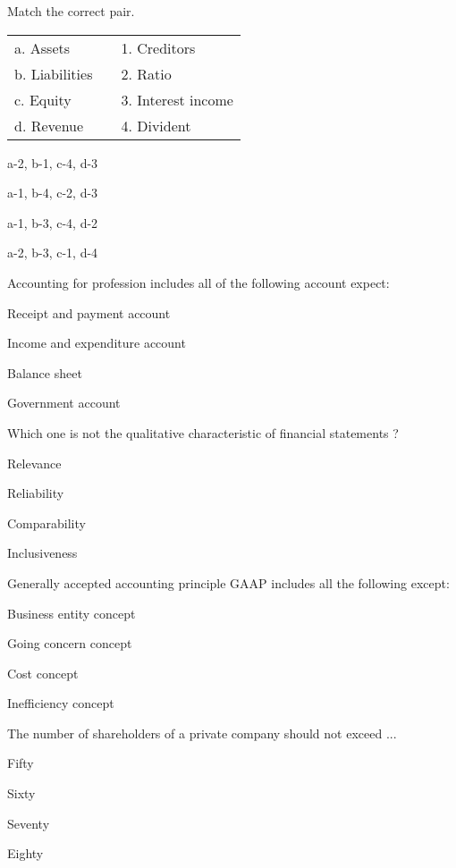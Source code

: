 \begin{questions}
\question Match the correct pair.
  \begin{table}[h]
  \centering
  \begin{tabular}{lll}
    a. Assets & & 1. Creditors \\[2mm]
    b. Liabilities & & 2. Ratio \\
    c. Equity & & 3. Interest income \\
    d. Revenue & & 4. Divident \\
  \end{tabular}
  \end{table}
  \begin{items}
  \item a-2, b-1, c-4, d-3
  \item a-1, b-4, c-2, d-3
  \item a-1, b-3, c-4, d-2
  \item a-2, b-3, c-1, d-4
  \end{items}

\question Accounting for profession includes all of the following account expect:
  \begin{items}
  \item Receipt and payment account
  \item Income and expenditure account
  \item Balance sheet
  \item Government account
  \end{items}

\question Which one is not the qualitative characteristic of financial statements ?
  \begin{items}
  \item Relevance
  \item Reliability
  \item Comparability
  \item Inclusiveness
  \end{items}

\question Generally accepted accounting principle GAAP includes all the following except:
  \begin{items}
  \item Business entity concept
  \item Going concern concept
  \item Cost concept
  \item Inefficiency concept
  \end{items}

\question The number of shareholders of a private company should not exceed ...
  \begin{items}
  \item Fifty
  \item Sixty
  \item Seventy
  \item Eighty
  \end{items}


\end{questions}
